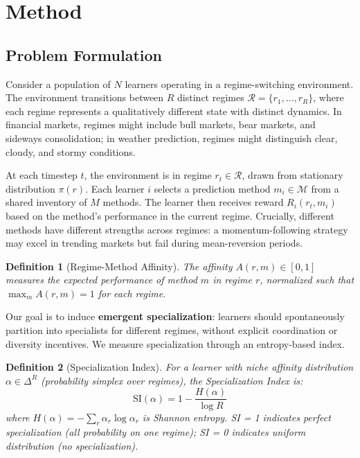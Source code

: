 \documentclass{article}
\newtheorem{definition}{Definition}
\newcommand{\SI}{\text{SI}}
\begin{document}
\section{Method}

\subsection{Problem Formulation}

Consider a population of $N$ learners operating in a regime-switching environment. The environment transitions between $R$ distinct regimes $\mathcal{R} = \{r_1, \ldots, r_R\}$, where each regime represents a qualitatively different state with distinct dynamics. In financial markets, regimes might include bull markets, bear markets, and sideways consolidation; in weather prediction, regimes might distinguish clear, cloudy, and stormy conditions.

At each timestep $t$, the environment is in regime $r_t \in \mathcal{R}$, drawn from stationary distribution $\pi(r)$. Each learner $i$ selects a prediction method $m_i \in \mathcal{M}$ from a shared inventory of $M$ methods. The learner then receives reward $R_i(r_t, m_i)$ based on the method's performance in the current regime. Crucially, different methods have different strengths across regimes: a momentum-following strategy may excel in trending markets but fail during mean-reversion periods.

\begin{definition}[Regime-Method Affinity]
The affinity $A(r, m) \in [0, 1]$ measures the expected performance of method $m$ in regime $r$, normalized such that $\max_m A(r, m) = 1$ for each regime.
\end{definition}

Our goal is to induce \textbf{emergent specialization}: learners should spontaneously partition into specialists for different regimes, without explicit coordination or diversity incentives. We measure specialization through an entropy-based index.

\begin{definition}[Specialization Index]
For a learner with niche affinity distribution $\alpha \in \Delta^R$ (probability simplex over regimes), the Specialization Index is:
\begin{equation}
    \SI(\alpha) = 1 - \frac{H(\alpha)}{\log R}
\end{equation}
where $H(\alpha) = -\sum_r \alpha_r \log \alpha_r$ is Shannon entropy. SI = 1 indicates perfect specialization (all probability on one regime); SI = 0 indicates uniform distribution (no specialization).
\end{definition}
\end{document}
